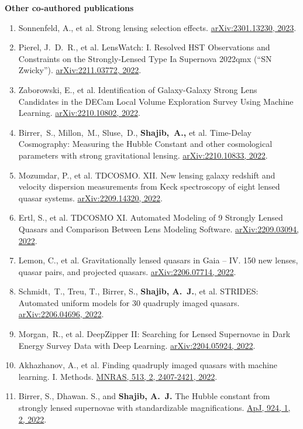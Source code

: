 \documentclass[margin, line]{res}
\begin{document}
\begin{resume}
\textbf{Other co-authored publications}
\begin{enumerate}
	\item Sonnenfeld, A., et al. Strong lensing selection effects. \href{https://arxiv.org/abs/2301.13230}{arXiv:2301.13230, 2023}.
	\item Pierel, J.~D.~R., et al. LensWatch: I. Resolved HST Observations and Constraints on the Strongly-Lensed Type Ia Supernova 2022qmx (``SN Zwicky'').  \href{https://arxiv.org/abs/2211.03772}{arXiv:2211.03772, 2022}.
	\item Zaborowski, E., et al. Identification of Galaxy-Galaxy Strong Lens Candidates in the DECam Local Volume Exploration Survey Using Machine Learning. \href{https://arxiv.org/abs/2210.10802}{arXiv:2210.10802, 2022}.
	\item Birrer,~S., Millon,~M., Sluse,~D., \textbf{Shajib,~A.,} et al. Time-Delay Cosmography: Measuring the Hubble Constant and other cosmological parameters with strong gravitational lensing. \href{https://arxiv.org/abs/2210.10833}{arXiv:2210.10833, 2022}.
	\item Mozumdar, P., et al. TDCOSMO. XII. New lensing galaxy redshift and velocity dispersion measurements from Keck spectroscopy of eight lensed quasar systems. \href{https://arxiv.org/abs/2209.14320}{arXiv:2209.14320, 2022}.
	\item Ertl, S., et al. TDCOSMO XI. Automated Modeling of 9 Strongly Lensed Quasars and Comparison Between Lens Modeling Software. \href{https://arxiv.org/abs/2209.03094}{arXiv:2209.03094, 2022}.
	\item Lemon, C., et al. Gravitationally lensed quasars in Gaia -- IV. 150 new lenses, quasar pairs, and projected quasars. \href{https://arxiv.org/abs/2206.07714}{arXiv:2206.07714, 2022}.
	\item Schmidt,~T., Treu, T., Birrer, S., \textbf{Shajib, A.~J.}, et al. STRIDES: Automated uniform models for 30 quadruply imaged quasars. \href{https://arxiv.org/abs/2206.04696}{arXiv:2206.04696, 2022}.
	\item Morgan,~R., et al. DeepZipper II: Searching for Lensed Supernovae in Dark Energy Survey Data with Deep Learning. \href{https://arxiv.org/abs/2204.05924}{arXiv:2204.05924, 2022}.
	\item Akhazhanov, A., et al. Finding quadruply imaged quasars with machine learning. I. Methods. \href{https://ui.adsabs.harvard.edu/abs/2022MNRAS.tmp..904A/abstract}{MNRAS, 513, 2, 2407-2421, 2022}.
	\item Birrer, S., Dhawan. S., and \textbf{Shajib, A.~J.} The Hubble constant from strongly lensed supernovae with standardizable magnifications. \href{https://iopscience.iop.org/article/10.3847/1538-4357/ac323a}{ApJ, 924, 1, 2, 2022}.

\end{enumerate}
\end{resume}
\end{document}
